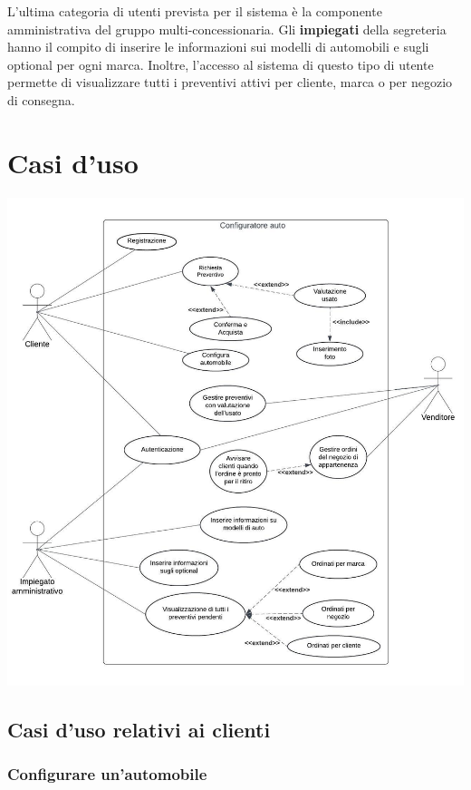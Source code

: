 \documentclass[openany, 12pt]{report}
\begin{document}
L'ultima categoria di utenti prevista per il sistema \`e la componente amministrativa del gruppo multi-concessionaria.
Gli \textbf{impiegati} della segreteria hanno il compito di inserire le informazioni sui modelli di automobili e sugli
optional per ogni marca. Inoltre, l'accesso al sistema di questo tipo di utente permette di visualizzare tutti i preventivi
attivi per cliente, marca o per negozio di consegna.

\section{Casi d'uso}

\begin{center}
\includegraphics[scale=0.8]{UseCase}
\end{center}

\subsection{Casi d'uso relativi ai clienti}
\subsubsection{Configurare un'automobile}
\end{document}
